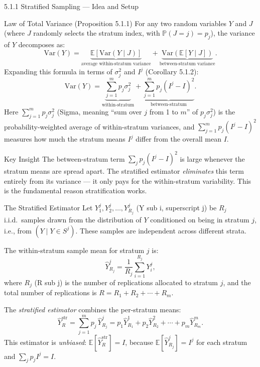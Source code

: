 \documentclass[aspectratio=169,10pt]{beamer}
\begin{document}
\begin{frame}[allowframebreaks]{5.1.1 Stratified Sampling --- Idea and Setup}
\begin{block}{Law of Total Variance (Proposition 5.1.1)}
  For any two random variables $Y$ and $J$ (where $J$ randomly selects the
  stratum index, with $\mathbb{P}(J=j) = p_j$), the variance of $Y$ decomposes as:
  \[
    \mathrm{Var}(Y)
    = \underbrace{\mathbb{E}[\mathrm{Var}(Y\mid J)]}_{\text{average within-stratum variance}}
    + \underbrace{\mathrm{Var}(\mathbb{E}[Y\mid J])}_{\text{between-stratum variance}}.
  \]
  Expanding this formula in terms of $\sigma_j^2$ and $I^j$ (Corollary 5.1.2):
  \[
    \mathrm{Var}(Y) = \underbrace{\sum_{j=1}^m p_j \sigma_j^2}_{\text{within-stratum}}
    + \underbrace{\sum_{j=1}^m p_j(I^j - I)^2}_{\text{between-stratum}}.
  \]
  Here $\sum_{j=1}^m p_j \sigma_j^2$ (Sigma, meaning ``sum over $j$ from 1 to $m$''
  of $p_j \sigma_j^2$) is the probability-weighted average of within-stratum
  variances, and $\sum_{j=1}^m p_j(I^j - I)^2$ measures how much the stratum
  means $I^j$ differ from the overall mean $I$.
\end{block}

\begin{alertblock}{Key Insight}
  The between-stratum term $\sum_j p_j(I^j - I)^2$ is large whenever the
  stratum means are spread apart.  The stratified estimator \emph{eliminates}
  this term entirely from its variance --- it only pays for the within-stratum
  variability.  This is the fundamental reason stratification works.
\end{alertblock}

\framebreak

\begin{block}{The Stratified Estimator}
  Let $Y_1^j, Y_2^j, \ldots, Y_{R_j}^j$ (Y sub i, superscript j)
  be $R_j$ i.i.d.\ samples drawn from the distribution of $Y$ conditioned on
  being in stratum $j$, i.e., from $(Y \mid Y \in S^j)$.
  These samples are independent across different strata.

  The within-stratum sample mean for stratum $j$ is:
  \[
    \hat{Y}_{R_j}^j = \frac{1}{R_j}\sum_{i=1}^{R_j} Y_i^j,
  \]
  where $R_j$ (R sub j) is the number of replications allocated to stratum $j$,
  and the total number of replications is $R = R_1 + R_2 + \cdots + R_m$.

  The \emph{stratified estimator} combines the per-stratum means:
  \[
    \hat{Y}_R^{\mathrm{str}} = \sum_{j=1}^m p_j \,\hat{Y}_{R_j}^j
    = p_1\hat{Y}_{R_1}^1 + p_2\hat{Y}_{R_2}^2 + \cdots + p_m\hat{Y}_{R_m}^m.
  \]
  This estimator is \emph{unbiased}: $\mathbb{E}[\hat{Y}_R^{\mathrm{str}}] = I$,
  because $\mathbb{E}[\hat{Y}_{R_j}^j] = I^j$ for each stratum and
  $\sum_j p_j I^j = I$.


\end{block}
\end{frame}
\end{document}
